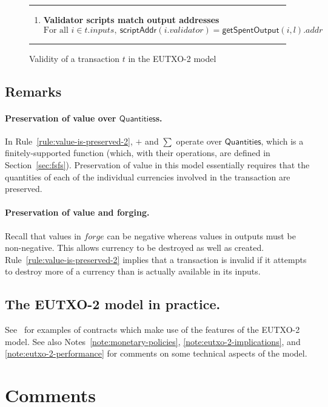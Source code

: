 \documentclass[a4paper]{article}
\newcounter{note}
\newcommand{\s}{\textsf}  %
\newcommand{\msf}[1]{\ensuremath{\mathsf{#1}}}
\newcommand{\mi}[1]{\ensuremath{\mathit{#1}}}
\newcommand\rfskip{7pt}
\newenvironment{ruledfigure}[1]{\begin{figure}[#1]\hrule\vspace{\rfskip}}{\vspace{\rfskip}\hrule\end{figure}}
\newcommand{\scriptAddr}{\msf{scriptAddr}}
\newcommand{\inputs}{\mi{inputs}}
\newcommand{\forge}{\mi{forge}}
\newcommand{\addr}{\mi{addr}}
\newcommand{\validator}{\mi{validator}}
\newcommand{\getSpent}{\msf{getSpentOutput}}
\newcommand{\qtymap}{\ensuremath{\s{Quantities}}}
\begin{document}
\begin{ruledfigure}{H}
\begin{enumerate}
\item
  \label{rule:validator-scripts-hash-2}
  \textbf{Validator scripts match output addresses}
  \begin{displaymath}
    \textrm{For all } i \in t.\inputs,\ \scriptAddr(i.\validator) = \getSpent(i, l).\addr
  \end{displaymath}

\end{enumerate}
\caption{Validity of a transaction $t$ in the EUTXO-2 model}
\label{fig:eutxo-2-validity}
\end{ruledfigure}

\subsection{Remarks}
\paragraph{Preservation of value over \qtymap{}s.}
In Rule~\ref{rule:value-is-preserved-2},
$+$ and $\sum$ operate over \qtymap{}, which is
a finitely-supported function (which, with their operations,
are defined in Section~\ref{sec:fsfs}). Preservation of value
in this model essentially requires that the
quantities of each of the individual currencies involved in the
transaction are preserved.

\paragraph{Preservation of value and forging.}
Recall that values in $\forge$ can be negative whereas values in
outputs must be non-negative. This allows currency to be destroyed as
well as created. Rule~\ref{rule:value-is-preserved-2} implies that a
transaction is invalid if it attempts to destroy more of a currency
than is actually available in its inputs.

\subsection{The EUTXO-2 model in practice.}
See~\cite{Plutus-book} for examples of contracts which make use of the
features of the EUTXO-2 model.  See also
Notes~\ref{note:monetary-policies}, \ref{note:eutxo-2-implications},
and \ref{note:eutxo-2-performance} for comments on some technical
aspects of the model.

\appendix
\section{Comments}
\label{appendix:comments}
\end{document}
